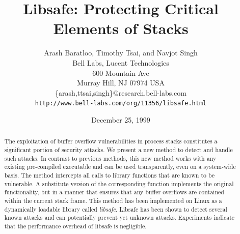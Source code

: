 \documentclass[]{article}
\begin{document}




\begin{singlespace}

\title{ Libsafe: Protecting Critical Elements of Stacks }

\author{
	Arash Baratloo, Timothy Tsai, and Navjot Singh \\
	Bell Labs, Lucent Technologies \\
	600 Mountain Ave \\
	Murray Hill, NJ  07974  USA \\
	\{arash,ttsai,singh\}@research.bell-labs.com \\
	{\tt http://www.bell-labs.com/org/11356/libsafe.html}
}

\date{December 25, 1999}

\maketitle

\end{singlespace}



\begin{singlespace}

\begin{abstract}

The exploitation of buffer overflow vulnerabilities in process stacks
constitutes a significant portion of security attacks.  We present a new method
to detect and handle such attacks.  In contrast to previous methods, this new
method works with any existing pre-compiled executable and can be used
transparently, even on a system-wide basis.  The method intercepts all calls to
library functions that are known to be vulnerable.  A substitute version of the
corresponding function implements the original functionality, but in a manner
that ensures that any buffer overflows are contained within the current stack
frame.  This method has been implemented on Linux as a dynamically loadable
library called {\em libsafe}.  Libsafe has been shown to detect several known
attacks and can potentially prevent yet unknown attacks.  Experiments indicate
that the performance overhead of libsafe is negligible.

\end{abstract}

\end{singlespace}
\end{document}
